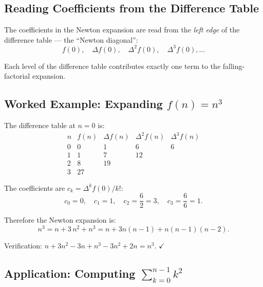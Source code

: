 \subsection*{Reading Coefficients from the Difference Table}

\begin{exposition}
The coefficients in the Newton expansion are read from the \emph{left
edge} of the difference table --- the ``Newton diagonal'':
\[
f(0),\quad
\Delta f(0),\quad
\Delta^2 f(0),\quad
\Delta^3 f(0), \dots
\]

\begin{center}

\end{center}

Each level of the difference table contributes exactly one term to the
falling-factorial expansion.
\end{exposition}

\subsection*{\texorpdfstring{Worked Example: Expanding \(f(n) = n^3\)}{Worked Example: Expanding f(n) = n cubed}}

\begin{example*}
The difference table at \(n = 0\) is:
\[
\begin{array}{c|c|c|c|c}
n & f(n) & \Delta f(n) & \Delta^2 f(n) & \Delta^3 f(n) \\
\hline
0 & 0  & 1  & 6  & 6 \\
1 & 1  & 7  & 12 &   \\
2 & 8  & 19 &    &   \\
3 & 27 &    &    &
\end{array}
\]

The coefficients are \(c_k = \Delta^k f(0)/k!\):
\[
c_0 = 0,\quad c_1 = 1,\quad c_2 = \frac{6}{2} = 3,\quad c_3 = \frac{6}{6} = 1.
\]

Therefore the Newton expansion is:
\[
n^3
= n + 3\,n^{\underline{2}} + n^{\underline{3}}
= n + 3n(n-1) + n(n-1)(n-2).
\]

Verification: \(n + 3n^2 - 3n + n^3 - 3n^2 + 2n = n^3.\) \(\checkmark\)
\end{example*}

\subsection*{\texorpdfstring{Application: Computing \(\sum_{k=0}^{n-1} k^2\)}{Application: Computing sum k=0 to n-1 k squared}}

